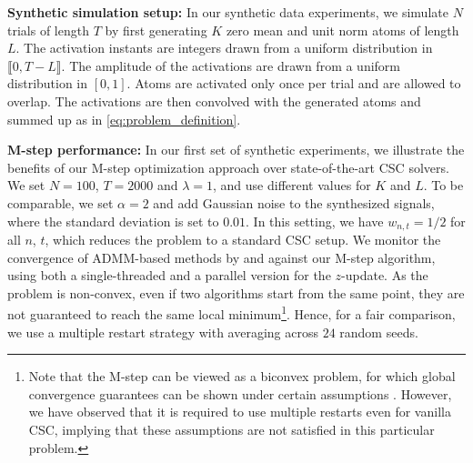 \textbf{Synthetic simulation setup:} 
In our synthetic data experiments, we simulate $N$ trials of length $T$ by first generating $K$ zero mean and unit norm atoms of length $L$. The  activation instants are integers drawn from a uniform distribution in $\llbracket0, T-L \rrbracket$. The amplitude of the activations are drawn from a uniform distribution in $[0, 1]$. Atoms are activated only once per trial and are allowed to overlap. The activations are then convolved with the generated atoms and summed up as in \eqref{eq:problem_definition}. 


\textbf{M-step performance:} 
In our first set of synthetic experiments, we illustrate the benefits of our M-step optimization approach over state-of-the-art CSC solvers. 
%
%
We set $N=100$, $T=2000$ and $\lambda=1$, and use different values for $K$ and $L$. To be comparable, we set $\alpha=2$ and add Gaussian noise to the synthesized signals, where the standard deviation is set to $0.01$. In this setting, we  have $w_{n,t}=1/2$ for all $n$, $t$, which reduces the problem to a standard CSC setup. We monitor the convergence of ADMM-based methods by \citet{heide2015fast} and \citet{wohlberg2016efficient} against our M-step algorithm, using both a single-threaded and a parallel version for the $z$-update. 
As the problem is non-convex, even if two algorithms start from the same point, they are not guaranteed to reach the same local minimum\footnote{Note that the M-step can be viewed as a biconvex problem, for which global convergence guarantees can be shown under certain assumptions \citep{agarwal2014learning, gorski2007biconvex}. However, we have observed that it is required to use multiple restarts even for vanilla CSC, implying that these assumptions are not satisfied in this particular problem.}. 
%
Hence, for a fair comparison, we use a multiple restart strategy with averaging across $24$ random seeds.




